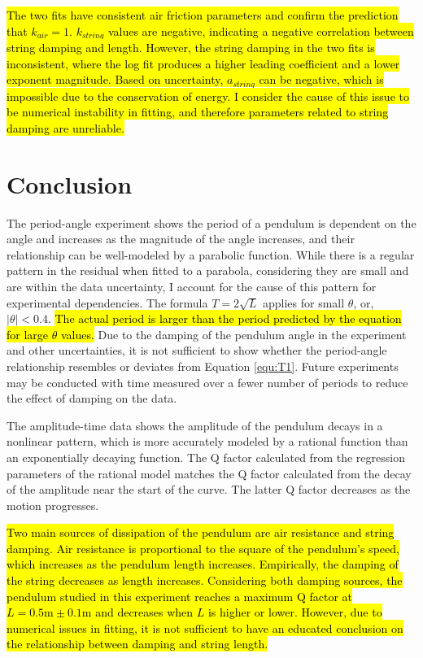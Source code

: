 \documentclass[12pt]{article}
\DeclareRobustCommand{\hlnew}[1]{{\sethlcolor{hlcnew}\hl{#1}}}
\begin{document}
\hlnew{The two fits have consistent air friction parameters and confirm the prediction that $k_{air}=1$. $k_{string}$ values are negative, indicating a negative correlation between string damping and length. However, the string damping in the two fits is inconsistent, where the log fit produces a higher leading coefficient and a lower exponent magnitude. Based on uncertainty, $a_{string}$ can be negative, which is impossible due to the conservation of energy. I consider the cause of this issue to be numerical instability in fitting, and therefore parameters related to string damping are unreliable.}


\section{Conclusion}

The period-angle experiment shows the period of a pendulum is dependent on the angle and increases as the magnitude of the angle increases, and their relationship can be well-modeled by a parabolic function. While there is a regular pattern in the residual when fitted to a parabola, considering they are small and are within the data uncertainty, I account for the cause of this pattern for experimental dependencies. The formula $T=2\sqrt{L}$ applies for small $\theta$, or, $|\theta|<0.4$. \hlnew{The actual period is larger than the period predicted by the equation for large $\theta$ values.} Due to the damping of the pendulum angle in the experiment and other uncertainties, it is not sufficient to show whether the period-angle relationship resembles or deviates from Equation \ref{equ:T1}. Future experiments may be conducted with time measured over a fewer number of periods to reduce the effect of damping on the data.

The amplitude-time data shows the amplitude of the pendulum decays in a nonlinear pattern, which is more accurately modeled by a rational function than an exponentially decaying function. The Q factor calculated from the regression parameters of the rational model matches the Q factor calculated from the decay of the amplitude near the start of the curve. The latter Q factor decreases as the motion progresses.

\hlnew{Two main sources of dissipation of the pendulum are air resistance and string damping. Air resistance is proportional to the square of the pendulum's speed, which increases as the pendulum length increases. Empirically, the damping of the string decreases as length increases. Considering both damping sources, the pendulum studied in this experiment reaches a maximum Q factor at $L=0.5\mathrm{m}\pm0.1\mathrm{m}$ and decreases when $L$ is higher or lower. However, due to numerical issues in fitting, it is not sufficient to have an educated conclusion on the relationship between damping and string length.}
\end{document}
